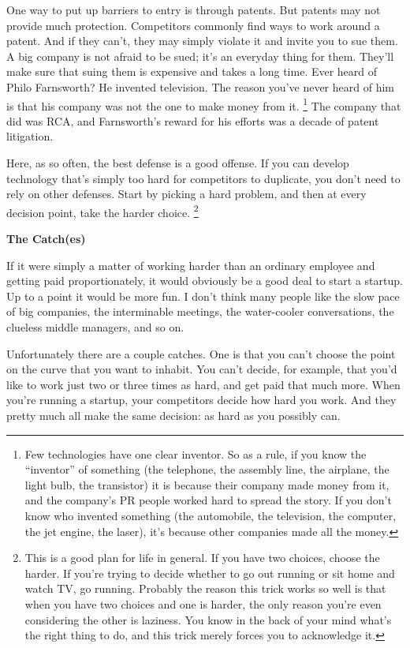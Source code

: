 \documentclass[12pt]{book}
\begin{document}
One way to put up barriers to entry is through patents. But patents may
not provide much protection. Competitors commonly find ways to work
around a patent. And if they can't, they may simply violate it and
invite you to sue them. A big company is not afraid to be sued; it's an
everyday thing for them. They'll make sure that suing them is expensive
and takes a long time. Ever heard of Philo Farnsworth? He invented
television. The reason you've never heard of him is that his company was
not the one to make money from it. \footnote{Few technologies have one clear inventor. So as a rule, if you
know the ``inventor'' of something (the telephone, the assembly line,
the airplane, the light bulb, the transistor) it is because their
company made money from it, and the company's PR people worked hard to
spread the story. If you don't know who invented something (the
automobile, the television, the computer, the jet engine, the laser),
it's because other companies made all the money.} The company
that did was RCA, and Farnsworth's reward for his efforts was a decade
of patent litigation.

Here, as so often, the best defense is a good offense. If you can
develop technology that's simply too hard for competitors to duplicate,
you don't need to rely on other defenses. Start by picking a hard
problem, and then at every decision point, take the harder choice.
\footnote{This is a good plan for life in general. If you have two
choices, choose the harder. If you're trying to decide whether to go out
running or sit home and watch TV, go running. Probably the reason this
trick works so well is that when you have two choices and one is harder,
the only reason you're even considering the other is laziness. You know
in the back of your mind what's the right thing to do, and this trick
merely forces you to acknowledge it.}

\textbf{The Catch(es)}

If it were simply a matter of working harder than an ordinary employee
and getting paid proportionately, it would obviously be a good deal to
start a startup. Up to a point it would be more fun. I don't think many
people like the slow pace of big companies, the interminable meetings,
the water-cooler conversations, the clueless middle managers, and so on.

Unfortunately there are a couple catches. One is that you can't choose
the point on the curve that you want to inhabit. You can't decide, for
example, that you'd like to work just two or three times as hard, and
get paid that much more. When you're running a startup, your competitors
decide how hard you work. And they pretty much all make the same
decision: as hard as you possibly can.
\end{document}
